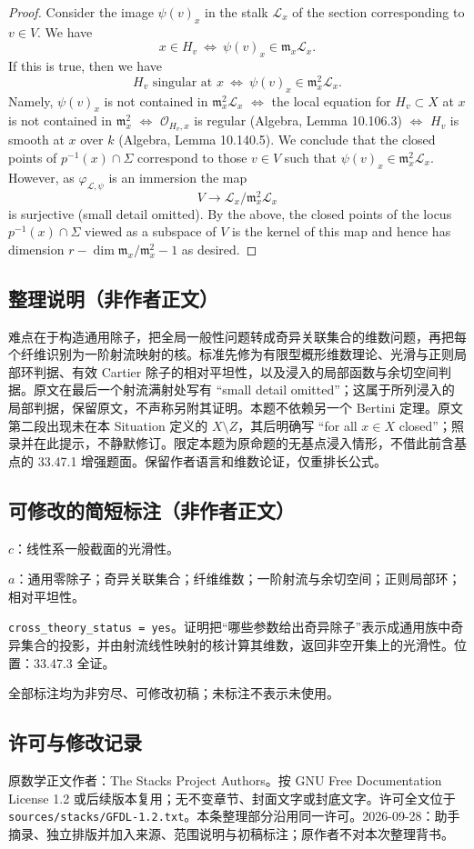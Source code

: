 \documentclass[UTF8,11pt]{ctexart}
\theoremstyle{definition}
\begin{document}
\begin{proof}
Consider the image $\psi(v)_x$ in the stalk $\mathcal L_x$ of the section corresponding to $v\in V$. We have
\[x\in H_v\ \Leftrightarrow\ \psi(v)_x\in\mathfrak m_x\mathcal L_x.\]
If this is true, then we have
\[H_v\text{ singular at }x\ \Leftrightarrow\ \psi(v)_x\in\mathfrak m_x^2\mathcal L_x.\]
Namely, $\psi(v)_x$ is not contained in $\mathfrak m_x^2\mathcal L_x$ $\Leftrightarrow$ the local equation for $H_v\subset X$ at $x$ is not contained in $\mathfrak m_x^2$ $\Leftrightarrow$ $\mathcal O_{H_v,x}$ is regular (Algebra, Lemma 10.106.3) $\Leftrightarrow$ $H_v$ is smooth at $x$ over $k$ (Algebra, Lemma 10.140.5). We conclude that the closed points of $p^{-1}(x)\cap\Sigma$ correspond to those $v\in V$ such that $\psi(v)_x\in\mathfrak m_x^2\mathcal L_x$. However, as $\varphi_{\mathcal L,\psi}$ is an immersion the map
\[V\longrightarrow\mathcal L_x/\mathfrak m_x^2\mathcal L_x\]
is surjective (small detail omitted). By the above, the closed points of the locus $p^{-1}(x)\cap\Sigma$ viewed as a subspace of $V$ is the kernel of this map and hence has dimension $r-\dim\mathfrak m_x/\mathfrak m_x^2-1$ as desired.
\end{proof}

\subsection*{整理说明（非作者正文）}
难点在于构造通用除子，把全局一般性问题转成奇异关联集合的维数问题，再把每个纤维识别为一阶射流映射的核。标准先修为有限型概形维数理论、光滑与正则局部环判据、有效 Cartier 除子的相对平坦性，以及浸入的局部函数与余切空间判据。原文在最后一个射流满射处写有 ``small detail omitted''；这属于所列浸入的局部判据，保留原文，不声称另附其证明。本题不依赖另一个 Bertini 定理。原文第二段出现未在本 Situation 定义的 $X\setminus Z$，其后明确写 ``for all $x\in X$ closed''；照录并在此提示，不静默修订。限定本题为原命题的无基点浸入情形，不借此前含基点的 33.47.1 增强题面。保留作者语言和维数论证，仅重排长公式。
\subsection*{可修改的简短标注（非作者正文）}
$c$：线性系一般截面的光滑性。

$a$：通用零除子；奇异关联集合；纤维维数；一阶射流与余切空间；正则局部环；相对平坦性。

\texttt{cross\_theory\_status = yes}。证明把“哪些参数给出奇异除子”表示成通用族中奇异集合的投影，并由射流线性映射的核计算其维数，返回非空开集上的光滑性。位置：33.47.3 全证。

全部标注均为非穷尽、可修改初稿；未标注不表示未使用。
\subsection*{许可与修改记录}
原数学正文作者：The Stacks Project Authors。按 GNU Free Documentation License 1.2 或后续版本复用；无不变章节、封面文字或封底文字。许可全文位于 \texttt{sources/stacks/GFDL-1.2.txt}。本条整理部分沿用同一许可。2026-09-28：助手摘录、独立排版并加入来源、范围说明与初稿标注；原作者不对本次整理背书。
\end{document}
